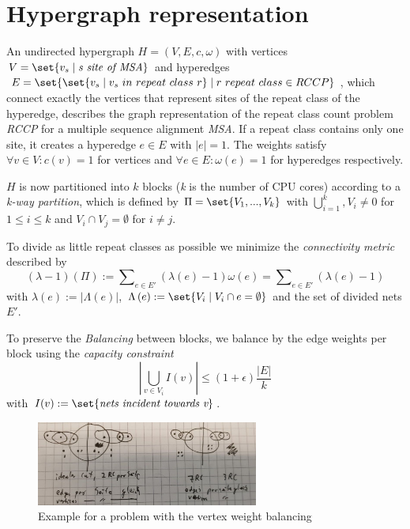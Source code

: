 \documentclass{article}
\DeclarePairedDelimiter\set\{\}
\begin{document}
	\section{Hypergraph representation}
	An undirected hypergraph $H=\left( V,E,c,\omega \right)$ with vertices $V=\set{ v_s \mid \textit{s site of MSA}}$ and hyperedges $E=\set{
		\set{
			v_s \mid v_s\ in\ repeat\ class\ r
		} \mid r\ repeat\ class \in RCCP
	}$, which connect exactly the vertices that represent sites of the repeat class of the hyperedge, describes the graph representation of the repeat class count problem \textit{RCCP} for a multiple sequence alignment \textit{MSA}. If a repeat class contains only one site, it creates a hyperedge $e \in E$ with $|e|=1$. The weights satisfy  $\forall v \in V: c\left(v\right)=1$ for vertices and $\forall e \in E: \omega\left(e\right)=1$ for hyperedges respectively.
	
	$H$ is now partitioned into $k$ blocks (\textit{k} is the number of CPU cores) according to a \textit{k-way partition}, which is defined by $\Pi = \set{V_1,...,V_k}$ with $\bigcup\nolimits_{i=1}^k, V_i \ne 0$ for $1 \leq i \leq k$ and $V_i \cap V_j = \emptyset$ for $i \neq j$.
	
	To divide as little repeat classes as possible we minimize the \textit{connectivity metric} described by  \[ \left(\lambda-1\right)\left(\Pi\right):=\sum\nolimits_{e \in E'}\left(\lambda\left(e\right)-1\right)\omega\left(e\right) = \sum\nolimits_{e \in E'}\left(\lambda\left(e\right)-1\right) \] with $\lambda\left(e\right):=|\Lambda\left(e\right)|$, $\Lambda\left(e\right):=\set{V_i \mid V_i \cap e = \emptyset}$ and the set of divided nets $E'$. 
	
	To preserve the \textit{Balancing} between blocks, we balance by the edge weights per block using the \textit{capacity constraint} \[ \left|\bigcup_{v \in V_i}I\left(v\right)\right| \leq \left(1+\epsilon\right)\frac{\left|E\right|}{k} \] with $I(v):=\set{\textit{nets incident towards v}}$.
	
	\begin{figure}[ht]
		\centering
		\includegraphics[width=0.65\textwidth]{example.png}
		\caption{Example for a problem with the vertex weight balancing}
		\label{fig:example}
	\end{figure}
	
\end{document}
